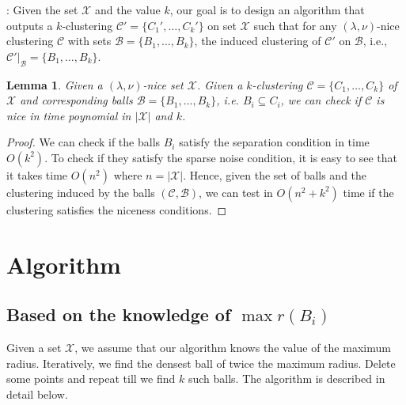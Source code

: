 \documentclass[twoside]{article}
\newcommand{\mc}{\mathcal}
\newtheorem{lemma}[theorem]{Lemma}
\begin{document}
: Given the set $\mc X$ and the value $k$, our goal is to design an algorithm that outputs a $k$-clustering $\mc C' =\{C_1',\ldots,C_k'\}$ on set $\mc X$ such that  for any $(\lambda,\nu)$-nice clustering $\mc C$ with sets $\mc B = \{B_1,\ldots,B_k\}$, the induced clustering of $\mc C'$ on $\mc B$, i.e., $\mc C'|_\mc B = \{B_1,\ldots,B_k\}$. 

\begin{lemma}
\label{lemma:chknice}
Given a $(\lambda,\nu)$-nice set $\mc X$. Given a $k$-clustering $\mc C = \{C_1,\ldots,C_k\}$ of $\mc X$ and corresponding balls $\mc B = \{B_1,\ldots,B_k\}$, i.e. $B_i \subseteq C_i$, we can check if $\mc C$ is nice in time poynomial in $|\mc X|$ and $k$.
\end{lemma}
\begin{proof}
We can check if the balls $B_i$ satisfy the separation condition in time $O(k^2)$. To check if they satisfy the sparse noise condition, it is easy to see that it takes time $O(n^2)$ where $n = |\mathcal{X}|$. Hence, given the set of balls and the clustering induced by the balls $(\mc C,\mc B)$, we can test in $O(n^2+k^2)$ time if the clustering satisfies the niceness conditions.
\end{proof}

\section{Algorithm}
\subsection{Based on the knowledge of $\max r(B_i)$}
Given a set $\mc X$, we assume that our algorithm knows the value of the maximum radius. Iteratively, we find the densest ball of twice the maximum radius. Delete some points and repeat till we find $k$ such balls. The algorithm is described in detail below.
\end{document}
